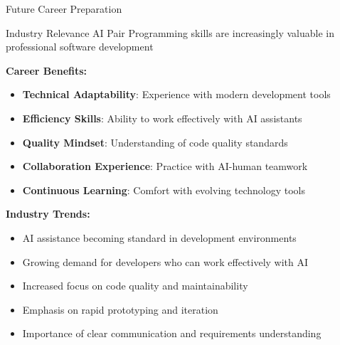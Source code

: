 \documentclass{beamer}
\begin{document}
\begin{frame}[t]{Future Career Preparation}
    \begin{block}{Industry Relevance}
        AI Pair Programming skills are increasingly valuable in professional software development
    \end{block}
    
    \textbf{Career Benefits:}
    \begin{itemize}
        \item \textbf{Technical Adaptability}: Experience with modern development tools
        \item \textbf{Efficiency Skills}: Ability to work effectively with AI assistants
        \item \textbf{Quality Mindset}: Understanding of code quality standards
        \item \textbf{Collaboration Experience}: Practice with AI-human teamwork
        \item \textbf{Continuous Learning}: Comfort with evolving technology tools
    \end{itemize}
    
    \textbf{Industry Trends:}
    \begin{itemize}
        \item AI assistance becoming standard in development environments
        \item Growing demand for developers who can work effectively with AI
        \item Increased focus on code quality and maintainability
        \item Emphasis on rapid prototyping and iteration
        \item Importance of clear communication and requirements understanding
    \end{itemize}
\end{frame}
\end{document}

